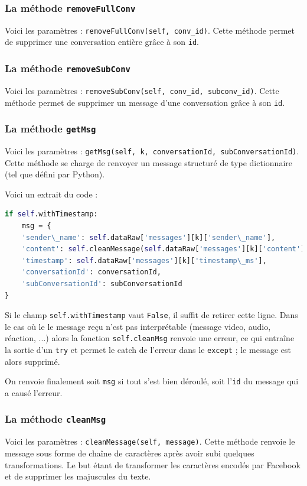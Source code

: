 \documentclass[10pt,a4paper]{article}
\begin{document}
\subsubsection{La méthode \texttt{removeFullConv}}
Voici les paramètres : \texttt{removeFullConv(self, conv\_id)}. Cette méthode permet de supprimer une conversation entière grâce à son \texttt{id}.

\subsubsection{La méthode \texttt{removeSubConv}}
Voici les paramètres : \texttt{removeSubConv(self, conv\_id, subconv\_id)}. Cette méthode permet de supprimer un message d'une conversation grâce à son \texttt{id}.

\subsubsection{La méthode \texttt{getMsg}}
Voici les paramètres : \texttt{getMsg(self, k, conversationId, subConversationId)}. Cette méthode se charge de renvoyer un message structuré de type dictionnaire (tel que défini par Python).

Voici un extrait du code :
\begin{lstlisting}[language=Python]
if self.withTimestamp:
	msg = {
	'sender\_name': self.dataRaw['messages'][k]['sender\_name'],
	'content': self.cleanMessage(self.dataRaw['messages'][k]['content']),
	'timestamp': self.dataRaw['messages'][k]['timestamp\_ms'],
	'conversationId': conversationId,
	'subConversationId': subConversationId
}
\end{lstlisting}

Si le champ \texttt{self.withTimestamp} vaut \texttt{False}, il suffit de retirer cette ligne. Dans le cas où le le message reçu n'est pas interprétable (message video, audio, réaction, ...) alors la fonction \texttt{self.cleanMsg} renvoie une erreur, ce qui entraîne la sortie d'un \texttt{try} et permet le catch de l'erreur dans le \texttt{except} ; le message est alors supprimé.

On renvoie finalement soit \texttt{msg} si tout s'est bien déroulé, soit l'\texttt{id} du message qui a causé l'erreur.

\subsubsection{La méthode \texttt{cleanMsg}}
Voici les paramètres : \texttt{cleanMessage(self, message)}. Cette méthode renvoie le message sous forme de chaîne de caractères après avoir subi quelques transformations. Le but étant de transformer les caractères encodés par Facebook et de supprimer les majuscules du texte.
\end{document}
